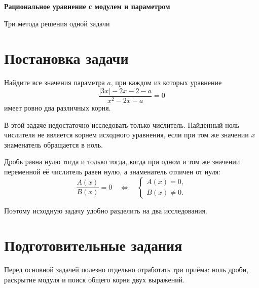 
\begin{center}
  {\fontsize{25}{30}\selectfont\bfseries\sffamily\color{Primary}
    Рациональное уравнение с модулем и параметром}

  \vspace{0.3em}

  {\large\sffamily\color{GrayText}
    Три метода решения одной задачи}
\end{center}

\vspace{0.45em}

\section{Постановка задачи}

\begin{problembox}
  Найдите все значения параметра \(a\), при каждом из которых уравнение
  \[
    \frac{|3x|-2x-2-a}{x^2-2x-a}=0
  \]
  имеет ровно два различных корня.
\end{problembox}

В этой задаче недостаточно исследовать только числитель. Найденный ноль
числителя не является корнем исходного уравнения, если при том же значении
\(x\) знаменатель обращается в ноль.

\begin{propertybox}
  Дробь равна нулю тогда и только тогда, когда при одном и том же значении
  переменной её числитель равен нулю, а знаменатель отличен от нуля:
  \[
    \frac{A(x)}{B(x)}=0
    \quad\Longleftrightarrow\quad
    \begin{cases}
      A(x)=0,\\
      B(x)\ne 0.
    \end{cases}
  \]
\end{propertybox}

Поэтому исходную задачу удобно разделить на два исследования.

\parameterlogicfigure

\section{Подготовительные задания}

Перед основной задачей полезно отдельно отработать три приёма: ноль дроби,
раскрытие модуля и поиск общего корня двух выражений.

